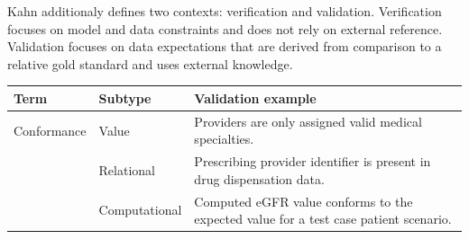 \documentclass[11pt]{book}
\begin{document}
Kahn additionaly defines two contexts: verification and validation.
Verification focuses on model and data constraints and does not rely on
external reference. Validation focuses on data expectations that are
derived from comparison to a relative gold standard and uses external
knowledge.

\begin{longtable}[]{@{}lll@{}}
\toprule
\begin{minipage}[b]{0.09\columnwidth}\raggedright\strut
Term\strut
\end{minipage} & \begin{minipage}[b]{0.16\columnwidth}\raggedright\strut
Subtype\strut
\end{minipage} & \begin{minipage}[b]{0.67\columnwidth}\raggedright\strut
Validation example\strut
\end{minipage}\tabularnewline
\midrule
\endhead
\begin{minipage}[t]{0.09\columnwidth}\raggedright\strut
Conformance\strut
\end{minipage} & \begin{minipage}[t]{0.16\columnwidth}\raggedright\strut
Value\strut
\end{minipage} & \begin{minipage}[t]{0.67\columnwidth}\raggedright\strut
Providers are only assigned valid medical specialties.\strut
\end{minipage}\tabularnewline
\begin{minipage}[t]{0.09\columnwidth}\raggedright\strut
\strut
\end{minipage} & \begin{minipage}[t]{0.16\columnwidth}\raggedright\strut
Relational\strut
\end{minipage} & \begin{minipage}[t]{0.67\columnwidth}\raggedright\strut
Prescribing provider identifier is present in drug dispensation
data.\strut
\end{minipage}\tabularnewline
\begin{minipage}[t]{0.09\columnwidth}\raggedright\strut
\strut
\end{minipage} & \begin{minipage}[t]{0.16\columnwidth}\raggedright\strut
Computational\strut
\end{minipage} & \begin{minipage}[t]{0.67\columnwidth}\raggedright\strut
Computed eGFR value conforms to the expected value for a test case
patient scenario.\strut

\end{minipage}
\end{longtable}
\end{document}
